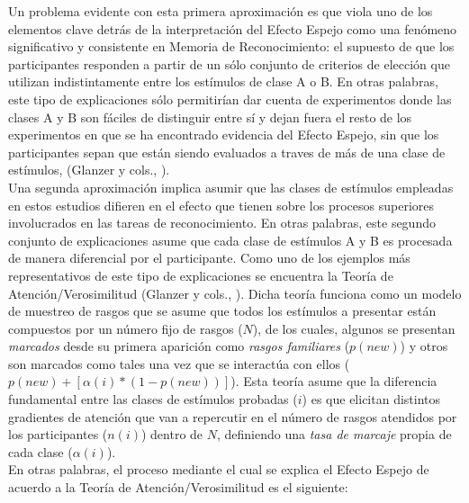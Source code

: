 Un problema evidente con esta primera aproximación es que viola uno de los elementos clave detrás de la interpretación del Efecto Espejo como una fenómeno significativo y consistente en Memoria de Reconocimiento: el supuesto de que los participantes responden a partir de un sólo conjunto de criterios de elección que utilizan indistintamente entre los estímulos de clase A o B. En otras palabras, este tipo de explicaciones sólo permitirían dar cuenta de experimentos donde las clases A y B son fáciles de distinguir entre sí y dejan fuera el resto de los experimentos en que se ha encontrado evidencia del Efecto Espejo, sin que los participantes sepan que están siendo evaluados a traves de más de una clase de estímulos, (Glanzer y cols., \citeyear{Glanzer1998}).\\

Una segunda aproximación implica asumir que las clases de estímulos empleadas en estos estudios difieren en el efecto que tienen sobre los procesos superiores involucrados en las tareas de reconocimiento. En otras palabras, este segundo conjunto de explicaciones asume que cada clase de estímulos A y B es procesada de manera diferencial por el participante. Como uno de los ejemplos más representativos de este tipo de explicaciones se encuentra la Teoría de Atención/Verosimilitud (Glanzer y cols., \citep{Glanzer1993}). Dicha teoría funciona como un modelo de muestreo de rasgos que se asume que todos los estímulos a presentar están compuestos por un número fijo de rasgos ($N$), de los cuales, algunos se presentan \textit{marcados} desde su primera aparición como \textit{rasgos familiares} ($p(new)$) y otros son marcados como tales una vez que se interactúa con ellos ($p(new) + [\alpha(i)* (1-p(new))]$). Esta teoría asume que la diferencia fundamental entre  las clases de estímulos probadas ($i$) es que elicitan distintos gradientes de atención que van a repercutir en el número de rasgos atendidos por los participantes ($n(i)$) dentro de $N$, definiendo una \textit{tasa de marcaje} propia de cada clase ($\alpha(i)$).\\

En otras palabras, el proceso mediante el cual se explica el Efecto Espejo de acuerdo a la Teoría de Atención/Verosimilitud es el siguiente:\\

